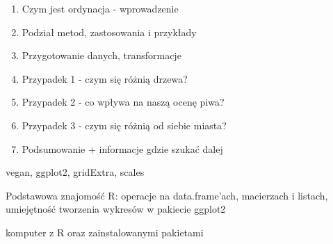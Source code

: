 \documentclass[\main/boa.tex]{subfiles}
\begin{document}
\planwarsztatu
\begin{enumerate}
\item Czym jest ordynacja - wprowadzenie
\item Podział metod, zastosowania i przykłady
\item Przygotowanie danych, transformacje
\item Przypadek 1 - czym się różnią drzewa?
\item Przypadek 2 - co wpływa na naszą ocenę piwa?
\item Przypadek 3 - czym się różnią od siebie miasta?
\item Podsumowanie + informacje gdzie szukać dalej
\end{enumerate}	 

\pakiety vegan, ggplot2, gridExtra, scales

\umiejetnosci Podstawowa znajomość R: operacje na data.frame'ach, macierzach i listach, umiejętność tworzenia wykresów w pakiecie ggplot2

\wymagania komputer z R oraz zainstalowanymi pakietami
\end{document}
